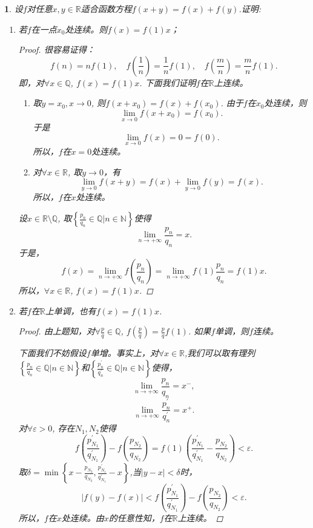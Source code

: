 \documentclass[utf8]{book}
\newtheorem{example}{}[section]             %
\begin{document}
\begin{example}
设$f$对任意$x,y\in\mathbb{R}$适合函数方程$f(x+y)=f(x)+f(y)$.证明:
\renewcommand\labelenumi{\normalfont(\theenumi)}
\begin{enumerate}
\item 若$f$在一点$x_0$处连续。则$f(x)=f(1)x$；
\begin{proof}很容易证得：
$$f(n) = nf(1), \quad f\left(\frac{1}{n}\right)=\frac{1}{n}f(1), \quad f\left(\frac{m}{n}\right)=\frac{m}{n}f(1).$$
即，对$\forall x\in\mathbb{Q}$, $f(x)=f(1)x$.
下面我们证明$f$在$\mathbb{R}$上连续。
\renewcommand\labelenumi{\normalfont(\theenumi)}
\begin{enumerate}
\item 取$y=x_0, x\to 0$, 则$f(x+x_0) = f(x) + f(x_0)$. 由于$f$在$x_0$处连续，则$$\displaystyle\lim_{x\to 0}f(x+x_0)=f(x_0).$$于是
$$\displaystyle\lim_{x\to 0}f(x)=0=f(0).$$
所以，$f$在$x=0$处连续。
\item 对$\forall x\in\mathbb{R}$, 取$y\to 0$，有 
$$\displaystyle\lim_{y\to 0}f(x+y) = f(x) + \displaystyle\lim_{y\to 0}f(y) =f(x).$$
所以，$f$在$x$处连续。
\end{enumerate}
设$x\in\mathbb{R}\setminus \mathbb{Q}$, 取$\left\{\displaystyle\frac{p_n}{q_n}\in\mathbb{Q}\bigg| n\in\mathbb{N}\right\}$使得
$$\displaystyle\lim_{n\to +\infty}\frac{p_n}{q_n}  = x.$$
于是，$$f(x) = \displaystyle\lim_{n\to +\infty}f\left(\frac{p_n}{q_n}\right)=\displaystyle\lim_{n\to +\infty}f(1)\frac{p_n}{q_n}=f(1)x.$$
所以，$\forall x\in\mathbb{R}$,  $f(x)=f(1)x$.
\end{proof}
\item 若$f$在$\mathbb{R}$上单调，也有$f(x)=f(1)x$.
\begin{proof}由上题知，对$\forall \frac{p}{q}\in\mathbb{Q}$, $f\left(\frac{p}{q}\right)=\frac{p}{q}f(1)$. 如果$f$单调，则$f$连续。

下面我们不妨假设$f$单增。事实上，对$\forall x\in\mathbb{R}$,我们可以取有理列
$\left\{\displaystyle\frac{p_n}{q_n}\in\mathbb{Q}\bigg| n\in\mathbb{N}\right\}$和$\left\{\displaystyle\frac{p^{\prime}_n}{q^{\prime}_n}\in\mathbb{Q}\bigg| n\in\mathbb{N}\right\}$使得，
$$\displaystyle\lim_{n\to +\infty}\frac{p_n}{q_n}  = x^-,$$
$$\displaystyle\lim_{n\to +\infty}\frac{p^{\prime}_n}{q^{\prime}_n} = x^+.$$
对$\forall \varepsilon > 0$, 存在$N_1, N_2$使得
$$f\left(\frac{p^{\prime}_{N_1}}{q^{\prime}_{N_1}}\right) - f\left(\frac{p_{N_2}}{q_{N_2}}\right) =f(1)\left(\frac{p^{\prime}_{N_1}}{q^{\prime}_{N_1}} - \frac{p_{N_2}}{q_{N_2}}\right) < \varepsilon.$$
取$\delta  = \min\left\{x-\frac{p_{N_2}}{q_{N_2}}, \frac{p^{\prime}_{N_1}}{q^{\prime}_{N_1}}-x\right\}$,当$|y-x|<\delta$时，
$$\left|f(y)-f(x)\right|< f\left(\frac{p^{\prime}_{N_1}}{q^{\prime}_{N_1}}\right) - f\left(\frac{p_{N_2}}{q_{N_2}}\right) < \varepsilon.$$
所以，$f$在$x$处连续。由$x$的任意性知，$f$在$\mathbb{R}$上连续。
\end{proof}
\end{enumerate}
\end{example}
\end{document}
